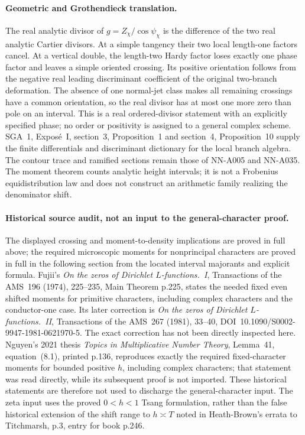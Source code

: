 \paragraph{Geometric and Grothendieck translation.}
The real analytic divisor of $g=Z_\chi/\cos\psi_\chi$ is the
difference of the two real analytic Cartier divisors. At a simple
tangency their two local length-one factors cancel. At a vertical
double, the length-two Hardy factor loses exactly one phase
factor and leaves a simple oriented crossing. Its positive
orientation follows from the negative real leading discriminant
coefficient of the original two-branch deformation. The absence
of one normal-jet class makes all remaining crossings have a
common orientation, so the real divisor has at most one more
zero than pole on an interval. This is a real ordered-divisor
statement with an explicitly specified phase; no order or
positivity is assigned to a general complex scheme.
SGA~1, Expos\'e~I, section~3, Proposition~1 and section~4,
Proposition~10 supply the finite differentials and discriminant
dictionary for the local branch algebra. The contour trace and
ramified sections remain those of NN-A005 and NN-A035. The
moment theorem counts analytic height intervals; it is not a
Frobenius equidistribution law and does not construct an
arithmetic family realizing the denominator shift.

\paragraph{Historical source audit, not an input to the general-character proof.}
The displayed crossing and moment-to-density implications are
proved in full above; the required microscopic moments for
nonprincipal characters are proved in full in the following
section from the located interval majorants and explicit formula.
Fujii's \emph{On the zeros of Dirichlet
$L$-functions.~I}, Transactions of the AMS~196 (1974), 225--235,
Main Theorem p.225, states the needed fixed even shifted moments
for primitive characters, including complex characters and the
conductor-one case. Its later correction is
\emph{On the zeros of Dirichlet $L$-functions.~II},
Transactions of the AMS~267 (1981), 33--40,
DOI~10.1090/S0002-9947-1981-0621970-5. The exact correction
has not been directly inspected here. Nguyen's 2021 thesis
\emph{Topics in Multiplicative Number Theory}, Lemma~41,
equation~(8.1), printed p.136, reproduces exactly the required
fixed-character moments for bounded positive $h$, including
complex characters; that statement was read directly, while
its subsequent proof is not imported. These historical statements
are therefore not used to discharge the general-character input.
The zeta input uses the proved $0<h<1$ Tsang formulation,
rather than the false historical
extension of the shift range to $h\asymp T$ noted in
Heath-Brown's errata to Titchmarsh, p.3, entry for book p.246.


